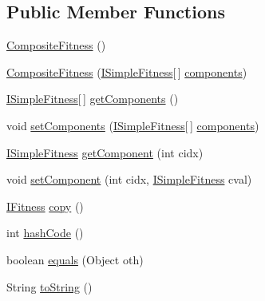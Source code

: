 \subsection*{Public Member Functions}
\begin{DoxyCompactItemize}
\item 
\hyperlink{classnet_1_1sf_1_1jclec_1_1fitness_1_1_composite_fitness_a50c01e28a561e33a9dc101bd0d73f256}{Composite\-Fitness} ()
\item 
\hyperlink{classnet_1_1sf_1_1jclec_1_1fitness_1_1_composite_fitness_a64993a2474f07b180233c50bc2c69855}{Composite\-Fitness} (\hyperlink{interfacenet_1_1sf_1_1jclec_1_1fitness_1_1_i_simple_fitness}{I\-Simple\-Fitness}\mbox{[}$\,$\mbox{]} \hyperlink{classnet_1_1sf_1_1jclec_1_1fitness_1_1_composite_fitness_a07576591ce53292c41a9283d0baed349}{components})
\item 
\hyperlink{interfacenet_1_1sf_1_1jclec_1_1fitness_1_1_i_simple_fitness}{I\-Simple\-Fitness}\mbox{[}$\,$\mbox{]} \hyperlink{classnet_1_1sf_1_1jclec_1_1fitness_1_1_composite_fitness_aedda6ed56ded03d23302dc2af74acbcf}{get\-Components} ()
\item 
void \hyperlink{classnet_1_1sf_1_1jclec_1_1fitness_1_1_composite_fitness_a844b1290850a2af85a2f26a26ea569ea}{set\-Components} (\hyperlink{interfacenet_1_1sf_1_1jclec_1_1fitness_1_1_i_simple_fitness}{I\-Simple\-Fitness}\mbox{[}$\,$\mbox{]} \hyperlink{classnet_1_1sf_1_1jclec_1_1fitness_1_1_composite_fitness_a07576591ce53292c41a9283d0baed349}{components})
\item 
\hyperlink{interfacenet_1_1sf_1_1jclec_1_1fitness_1_1_i_simple_fitness}{I\-Simple\-Fitness} \hyperlink{classnet_1_1sf_1_1jclec_1_1fitness_1_1_composite_fitness_a91dfbecf11e3687bb1c475d8172dac65}{get\-Component} (int cidx)
\item 
void \hyperlink{classnet_1_1sf_1_1jclec_1_1fitness_1_1_composite_fitness_a15d0e15f3df82448ccc3d19945eeecde}{set\-Component} (int cidx, \hyperlink{interfacenet_1_1sf_1_1jclec_1_1fitness_1_1_i_simple_fitness}{I\-Simple\-Fitness} cval)
\item 
\hyperlink{interfacenet_1_1sf_1_1jclec_1_1_i_fitness}{I\-Fitness} \hyperlink{classnet_1_1sf_1_1jclec_1_1fitness_1_1_composite_fitness_add4d3a372842bde2a49fad94e03653c1}{copy} ()
\item 
int \hyperlink{classnet_1_1sf_1_1jclec_1_1fitness_1_1_composite_fitness_a186f49971ffbc28a891eb7756349faa8}{hash\-Code} ()
\item 
boolean \hyperlink{classnet_1_1sf_1_1jclec_1_1fitness_1_1_composite_fitness_a5af34e8b30c934faf50657e53fbc61ad}{equals} (Object oth)
\item 
String \hyperlink{classnet_1_1sf_1_1jclec_1_1fitness_1_1_composite_fitness_a5a6325fe5e88650700181ef92d995507}{to\-String} ()
\end{DoxyCompactItemize}
